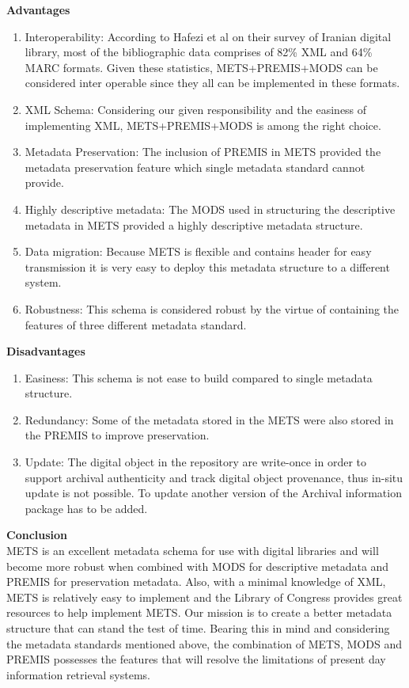 \begin{enumerate}
	{\bf Advantages}
	\begin{enumerate}
		\item Interoperability: According to Hafezi et al on their survey of Iranian digital library, most of the bibliographic data comprises of 82\% XML and 64\% MARC formats. 
								Given these statistics, METS+PREMIS+MODS can be considered inter operable since they all can be implemented in these formats.\cite{AlipourHafezi2013}					
		\item XML Schema: Considering our given responsibility and the easiness of implementing XML, METS+PREMIS+MODS is among the right choice. 
		\item Metadata Preservation: The inclusion of PREMIS in METS provided the metadata preservation feature which single metadata standard cannot provide.
		\item Highly descriptive metadata: The MODS used in structuring the descriptive metadata in METS provided a highly descriptive metadata structure.
		\item Data migration: Because METS is flexible and contains header for easy transmission it is very easy to deploy this metadata structure to a different system.
		\item Robustness: This schema is considered robust by the virtue of containing the features of three different metadata standard.
	\end{enumerate}	
	{\bf Disadvantages}
	\begin{enumerate}
		\item Easiness: This schema is not ease to build compared to single metadata structure.
		\item Redundancy: Some of the metadata stored in the METS were also stored in the PREMIS to improve preservation.
		\item Update: The digital object in the repository are write-once in order to support archival authenticity and track digital object provenance, thus in-situ update is not possible. 
		To update another version of the Archival information package has to be added.
	\end{enumerate}
	{\bf Conclusion}\\
	METS is an excellent metadata schema for use with digital libraries and will become more robust when combined with MODS for descriptive metadata and PREMIS for preservation metadata.
	Also, with a minimal knowledge of XML, METS is relatively easy to implement and the Library of Congress provides great resources to help implement METS.
	Our mission is to create a better metadata structure that can stand the test of time.
	Bearing this in mind and considering the metadata standards mentioned above, the combination of METS, MODS and PREMIS possesses the features that will resolve the limitations of present day information retrieval systems.
	

\end{enumerate}
